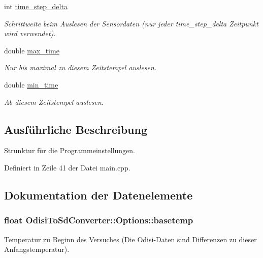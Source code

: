 \begin{DoxyCompactItemize}
int \hyperlink{structOdisiToSdConverter_1_1Options_a2e5c6038a0ff5ca7d32be89740b82aa4}{time\-\_\-step\-\_\-delta}
\begin{DoxyCompactList}\small\item\em Schrittweite beim Auslesen der Sensordaten (nur jeder time\-\_\-step\-\_\-delta Zeitpunkt wird verwendet). \end{DoxyCompactList}\item 
double \hyperlink{structOdisiToSdConverter_1_1Options_afb526c278f5e4273379c0e6345ce01c0}{max\-\_\-time}
\begin{DoxyCompactList}\small\item\em Nur bis maximal zu diesem Zeitstempel auslesen. \end{DoxyCompactList}\item 
double \hyperlink{structOdisiToSdConverter_1_1Options_a2c97daa31cfdd315fd1d9a3307665edb}{min\-\_\-time}
\begin{DoxyCompactList}\small\item\em Ab diesem Zeitstempel auslesen. \end{DoxyCompactList}\end{DoxyCompactItemize}


\subsection{Ausführliche Beschreibung}
Strunktur für die Programmeinstellungen. 

Definiert in Zeile 41 der Datei main.\-cpp.



\subsection{Dokumentation der Datenelemente}
\hypertarget{structOdisiToSdConverter_1_1Options_a3bda06d5caa4384aba4bd5302b44cde0}{
\subsubsection[{basetemp}]{\setlength{\rightskip}{0pt plus 5cm}float Odisi\-To\-Sd\-Converter\-::\-Options\-::basetemp}}\label{structOdisiToSdConverter_1_1Options_a3bda06d5caa4384aba4bd5302b44cde0}


Temperatur zu Beginn des Versuches (Die Odisi-\/\-Daten sind Differenzen zu dieser Anfangstemperatur). 



